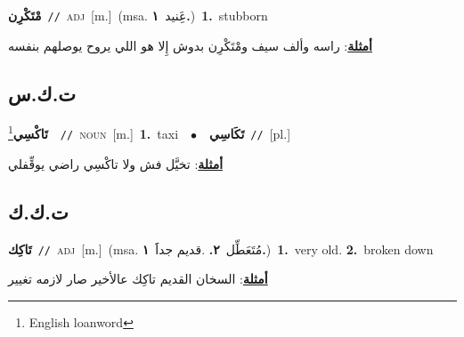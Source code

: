 \documentclass[10pt,a4paper,twoside]{article} %
\begin{document}
\begin{multicols}{2}
{\setlength\topsep{0pt}\textbf{\foreignlanguage{arabic}{مْتَكْرِن}}\ {\color{gray}\texttt{//}\color{black}}\ \textsc{adj}\ [m.]\ \color{gray}(msa. \foreignlanguage{arabic}{عَِنيد}~\foreignlanguage{arabic}{\textbf{١.}})\color{black}\ \textbf{1.}~stubborn\  \begin{flushright}\color{gray}\foreignlanguage{arabic}{\textbf{\underline{\foreignlanguage{arabic}{أمثلة}}}: راسه وألف سيف ومْتَكْرِن بدوش إِلا هو اللي يروح يوصلهم بنفسه}\end{flushright}\color{black}} \vspace{2mm}

\vspace{-3mm}
\subsection*{\color{blue}\foreignlanguage{arabic}{ت.ك.س}\color{blue}{ (ntws)}} 

{\setlength\topsep{0pt}\textbf{\foreignlanguage{arabic}{تَاكْسِي}}\footnote{English loanword}\ \ {\color{gray}\texttt{//}\color{black}}\ \textsc{noun}\ [m.]\ \textbf{1.}~taxi\ \ $\bullet$\ \ \setlength\topsep{0pt}\textbf{\foreignlanguage{arabic}{تَكَاسِي}}\ {\color{gray}\texttt{//}\color{black}}\ [pl.]\  \begin{flushright}\color{gray}\foreignlanguage{arabic}{\textbf{\underline{\foreignlanguage{arabic}{أمثلة}}}: تخيَّل فش ولا تاكْسِي راضي يوقِّفلي}\end{flushright}\color{black}} \vspace{2mm}

\vspace{-3mm}
\subsection*{\color{blue}\foreignlanguage{arabic}{ت.ك.ك}\color{blue}{}} 

{\setlength\topsep{0pt}\textbf{\foreignlanguage{arabic}{تَاكِك}}\ {\color{gray}\texttt{//}\color{black}}\ \textsc{adj}\ [m.]\ \color{gray}(msa. \foreignlanguage{arabic}{مُتَعَطِّل}~\foreignlanguage{arabic}{\textbf{٢.}}  .\foreignlanguage{arabic}{قديم جداََ}~\foreignlanguage{arabic}{\textbf{١.}})\color{black}\ \textbf{1.}~very old.  \textbf{2.}~broken down\  \begin{flushright}\color{gray}\foreignlanguage{arabic}{\textbf{\underline{\foreignlanguage{arabic}{أمثلة}}}: السخان القديم تاكِك عالأخير صار لازمه تغيير}\end{flushright}\color{black}} \vspace{2mm}


\end{multicols}
\end{document}
